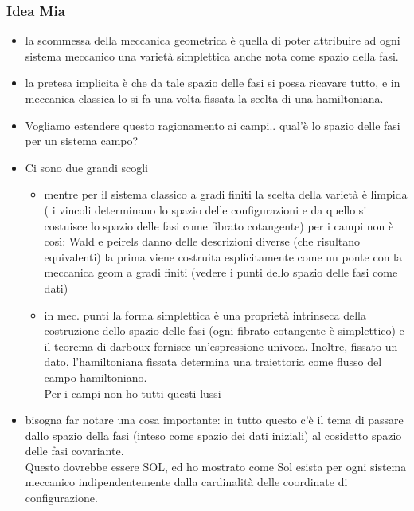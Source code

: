 \documentclass[Cascione]{subfiles}
\begin{document}
		\subsubsection{Idea Mia}
			\begin{itemize}
				\item la scommessa della meccanica geometrica è quella di poter attribuire ad ogni sistema meccanico una varietà simplettica anche nota come spazio della fasi.
				\item la pretesa implicita è che da tale spazio delle fasi si possa ricavare tutto, e in meccanica classica lo si fa una volta fissata la scelta di una hamiltoniana.
				\item Vogliamo estendere questo ragionamento ai campi.. qual'è lo spazio delle fasi per un sistema campo?
				\item Ci sono due grandi scogli
					\begin{itemize}
						\item mentre per il sistema classico a gradi finiti la scelta della varietà è limpida ( i vincoli determinano lo spazio delle configurazioni e da quello si costuisce lo spazio delle fasi come fibrato cotangente) per i campi non è così: Wald e peirels danno delle descrizioni diverse (che risultano equivalenti) la prima viene costruita esplicitamente come un ponte  con la meccanica geom a gradi finiti (vedere i punti dello spazio delle fasi come dati)
						\item in mec. punti la forma simplettica è una proprietà intrinseca della costruzione dello spazio delle fasi (ogni fibrato cotangente è simplettico) e il teorema di darboux fornisce un'espressione univoca.
							Inoltre, fissato un dato, l'hamiltoniana fissata determina una traiettoria come flusso del campo hamiltoniano.\\
							Per i campi non ho tutti questi lussi				
					\end{itemize}
				\item bisogna far notare una cosa importante: in tutto questo c'è il tema di passare dallo spazio della fasi (inteso come spazio dei dati iniziali) al cosidetto spazio delle fasi covariante.\\
					Questo dovrebbe essere SOL, ed ho mostrato come Sol esista per ogni sistema meccanico indipendentemente dalla cardinalità delle coordinate di configurazione.
			\end{itemize}		


	\newpage
\end{document}
